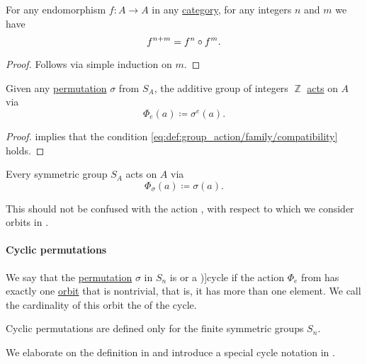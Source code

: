 \begin{lemma}\label{thm:sum_of_powers_in_composition}
  For any endomorphism \( f: A \to A \) in any \hyperref[def:category]{category}, for any integers \( n \) and \( m \) we have
  \begin{equation*}
    f^{n + m} = f^n \bincirc f^m.
  \end{equation*}
\end{lemma}
\begin{proof}
  Follows via simple induction on \( m \).
\end{proof}

\begin{proposition}\label{thm:symmetric_group_action}
  Given any \hyperref[def:symmetric_group]{permutation} \( \sigma \) from \( S_A \), the additive group of integers \( \BbbZ \) \hyperref[def:group_action]{acts} on \( A \) via
  \begin{equation*}
    \Phi_e(a) \coloneqq \sigma^e(a).
  \end{equation*}
\end{proposition}
\begin{proof}
   implies that the condition \eqref{eq:def:group_action/family/compatibility} holds.
\end{proof}

\begin{remark}\label{rem:symmetric_group_actions}
  Every symmetric group \( S_A \) acts on \( A \) via
  \begin{equation*}
    \Phi_\sigma(a) \coloneqq \sigma(a).
  \end{equation*}

  This should not be confused with the action , with respect to which we consider orbits in .
\end{remark}

\paragraph{Cyclic permutations}

\begin{definition}\label{def:cyclic_permutation}
  We say that the \hyperref[def:symmetric_group]{permutation} \( \sigma \) in \( S_n \) is  or a \term[ru=цикл (\cite[sec. 4.3]{Тыртышников2007ЛинАлгебра})]{cycle} if the action \( \Phi_e \) from  has exactly one \hyperref[def:group_action_orbit]{orbit} that is nontrivial, that is, it has more than one element. We call the cardinality of this orbit the  of the cycle.
\end{definition}
\begin{comments}
  \item Cyclic permutations are defined only for the finite symmetric groups \( S_n \).
  \item We elaborate on the definition in  and introduce a special cycle notation in .
\end{comments}

